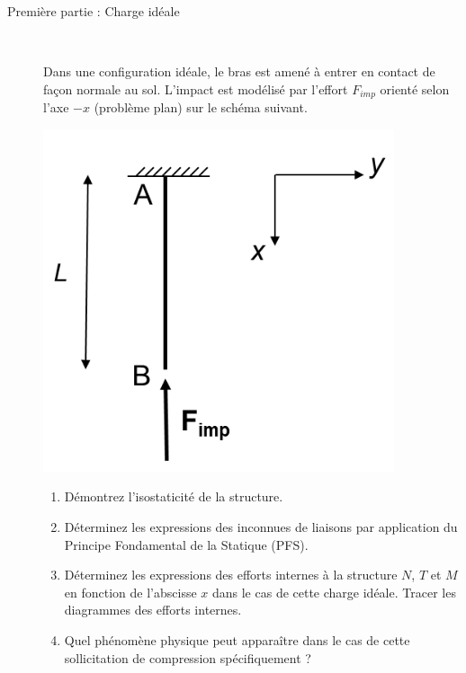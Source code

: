 \documentclass[lecture.tex]{subfiles}
\begin{document}
\bigskip

\begin{description}

  \item[Première partie : Charge idéale] \ \par
  Dans une configuration idéale, le bras est amené à entrer en contact de façon normale au sol. L’impact est modélisé par l’effort $F_{imp}$ orienté selon l’axe $-x$ (problème plan) sur le schéma suivant.
  \begin{center}
    \includegraphics[scale=0.4]{figC0026.png}
  \end{center}
  \begin{enumerate}
    \item Démontrez l'isostaticité de la structure.
    \item Déterminez les expressions des inconnues de liaisons par application du Principe Fondamental de la Statique (PFS).
    \item Déterminez les expressions des efforts internes à la structure $N$, $T$ et $M$ en fonction de l'abscisse $x$ dans le cas de cette charge idéale. Tracer les diagrammes des efforts internes.
    \item Quel phénomène physique peut apparaître dans le cas de cette sollicitation de compression spécifiquement ?
  \end{enumerate}


\end{description}
\end{document}
